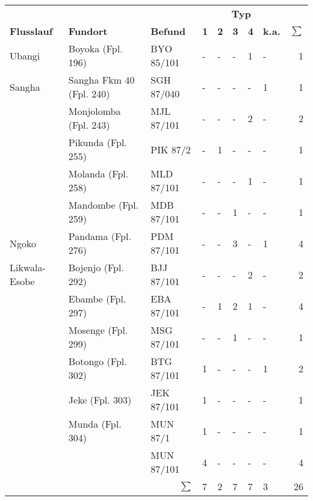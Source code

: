 \begin{tabular}{@{}llllllllr@{}}
	\toprule
	{}            & {}                       & {}            & \multicolumn{5}{c}{\textbf{Typ}} &   \\
	\textbf{Flusslauf}    & \textbf{Fundort}                      & \textbf{Befund}        & \textbf{1}    & \textbf{2}    & \textbf{3}    & \textbf{4}    & \textbf{k.a.}     & \textbf{$\sum$} \\ \midrule
	\mbox{Ubangi}        & Boyoka (Fpl. 196)        & BYO 85/101    & -   & -   & -   & 1   & -    &  1 \\
	\mbox{Sangha}        & \mbox{Sangha} Fkm 40 (Fpl. 240) & SGH 87/040 & -   & -   & -   & -   & 1    &  1 \\
	{}            & Monjolomba (Fpl. 243)    & MJL 87/101    & -   & -   & -   & 2   & -    &  2 \\
	{}            & Pikunda (Fpl. 255)       & PIK 87/2      & -   & 1   & -   & -   & -    &  1 \\
	{}            & Molanda (Fpl. 258)       & MLD 87/101    & -   & -   & -   & 1   & -    &  1 \\
	{}            & Mandombe (Fpl. 259)      & MDB 87/101    & -   & -   & 1   & -   & -    &  1 \\
	\mbox{Ngoko}         & Pandama (Fpl. 276)       & PDM 87/101    & -   & -   & 3   & -   & 1    &  4 \\
	Likwala-Esobe & Bojenjo (Fpl. 292)       & BJJ 87/101    & -   & -   & -   & 2   & -    &  2 \\
	{}            & Ebambe (Fpl. 297)        & EBA 87/101    & -   & 1   & 2   & 1   & -    &  4 \\
	{}            & Mosenge (Fpl. 299)       & MSG 87/101    & -   & -   & 1   & -   & -    &  1 \\
	{}            & Botongo (Fpl. 302)       & BTG 87/101    & 1   & -   & -   & -   & 1    &  2 \\
	{}            & Jeke (Fpl. 303)          & JEK 87/101    & 1   & -   & -   & -   & -    &  1 \\
	{}            & Munda (Fpl. 304)         & MUN 87/1      & 1   & -   & -   & -   & -    &  1 \\
	{}            & {}                       & MUN 87/101    & 4   & -   & -   & -   & -    &  4 \\ \midrule
	{}            & {}                       & \multicolumn{1}{r}{\textbf{$\sum$}}            & 7   & 2   & 7   & 7   & 3    & 26 \\ \bottomrule
\end{tabular}
